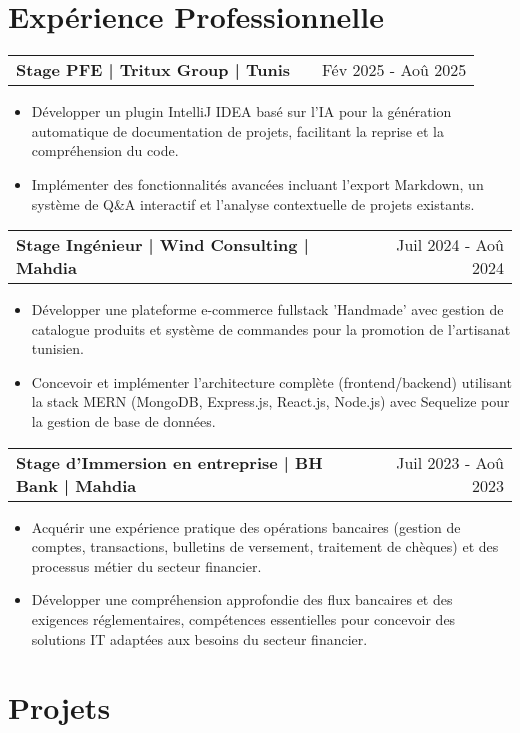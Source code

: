 \documentclass[a4paper,11pt]{article}
\makeatletter
\newenvironment{jobshort}[2]
    {
    \begin{tabularx}{\linewidth}{@{}l X r@{}}
    \textbf{#1} & \hfill &  #2 \\[2.75pt]
    \end{tabularx}
    \begin{minipage}[t]{\linewidth}
    \begin{itemize}[nosep,after=\strut, leftmargin=1em, itemsep=2pt]
    }
    {
    \end{itemize}
    \end{minipage}
    }
\makeatother
\begin{document}
\section{Expérience Professionnelle}

\begin{jobshort}{Stage PFE | Tritux Group | Tunis}{Fév 2025 - Aoû 2025}
\item Développer un plugin IntelliJ IDEA basé sur l'IA pour la génération automatique de documentation de projets, facilitant la reprise et la compréhension du code.
\item Implémenter des fonctionnalités avancées incluant l'export Markdown, un système de Q\&A interactif et l'analyse contextuelle de projets existants.
\end{jobshort}

\begin{jobshort}{Stage Ingénieur | Wind Consulting | Mahdia}{Juil 2024 - Aoû 2024}
\item Développer une plateforme e-commerce fullstack 'Handmade' avec gestion de catalogue produits et système de commandes pour la promotion de l'artisanat tunisien.
\item Concevoir et implémenter l'architecture complète (frontend/backend) utilisant la stack MERN (MongoDB, Express.js, React.js, Node.js) avec Sequelize pour la gestion de base de données.
\end{jobshort}

\begin{jobshort}{Stage d'Immersion en entreprise | BH Bank | Mahdia}{Juil 2023 - Aoû 2023}
\item Acquérir une expérience pratique des opérations bancaires (gestion de comptes, transactions, bulletins de versement, traitement de chèques) et des processus métier du secteur financier.
\item Développer une compréhension approfondie des flux bancaires et des exigences réglementaires, compétences essentielles pour concevoir des solutions IT adaptées aux besoins du secteur financier.
\end{jobshort}

\section{Projets}
\end{document}

